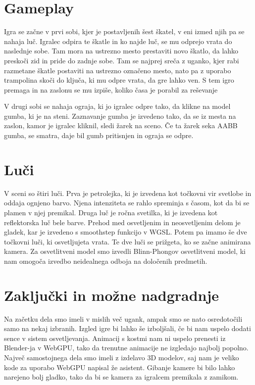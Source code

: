 \documentclass[a4paper,12pt]{article}
\begin{document}
\newpage

\section{Gameplay}
\noindent Igra se začne v prvi sobi, kjer je postavljenih šest škatel, v eni izmed njih pa se nahaja luč. Igralec odpira te škatle in ko najde luč, se mu odprejo vrata do naslednje sobe. Tam mora na ustrezno mesto prestaviti novo škatlo, da lahko preskoči zid in pride do zadnje sobe. Tam se najprej sreča z uganko, kjer rabi razmetane škatle postaviti na ustrezno označeno mesto, nato pa z uporabo trampolina skoči do ključa, ki mu odpre vrata, da gre lahko ven. S tem igro premaga in na zaslonu se mu izpiše, koliko časa je porabil za reševanje

V drugi sobi se nahaja ograja, ki jo igralec odpre tako, da klikne na model gumba, ki je na steni. Zaznavanje gumba je izvedeno tako, da se iz mesta na zaslon, kamor je igralec kliknil, sledi žarek na sceno. Če ta žarek seka AABB gumba, se smatra, daje bil gumb pritisnjen in ograja se odpre.

\section{Luči}
V sceni so štiri luči. Prva je petrolejka, ki je izvedena kot točkovni vir svetlobe in oddaja ognjeno barvo. Njena intenziteta se rahlo spreminja s časom, kot da bi se plamen v njej premikal. Druga luč je ročna svetilka, ki je izvedena kot reflektorska luč bele barve. Prehod med osvetljenim in neosvetljenim delom je gladek, kar je izvedeno s smoothstep funkcijo v WGSL. Potem pa imamo še dve točkovni luči, ki osvetljujeta vrata. Te dve luči se prižgeta, ko se začne animirana kamera.
Za osvetlitveni model smo izvedli Blinn-Phongov osvetlitveni model, ki nam omogoča izvedbo neidealnega odboja na določenih predmetih.

\newpage

\section{Zaključki in možne nadgradnje}
\noindent Na začetku dela smo imeli v mislih več ugank, ampak smo se nato osredotočili samo na nekaj izbranih. Izgled igre bi lahko še izboljšali, če bi nam uspelo dodati sence v sistem osvetljevanja. Animacij s kostmi nam ni uspelo prenesti iz Blender-ja v WebGPU, tako da trenutne animacije ne izgledajo najbolj popolno. Največ samostojnega dela smo imeli z izdelavo 3D modelov, saj nam je veliko kode za uporabo WebGPU napisal že asistent.
Gibanje kamere bi bilo lahko narejeno bolj gladko, tako da bi se kamera za igralcem premikala z zamikom.
\end{document}
